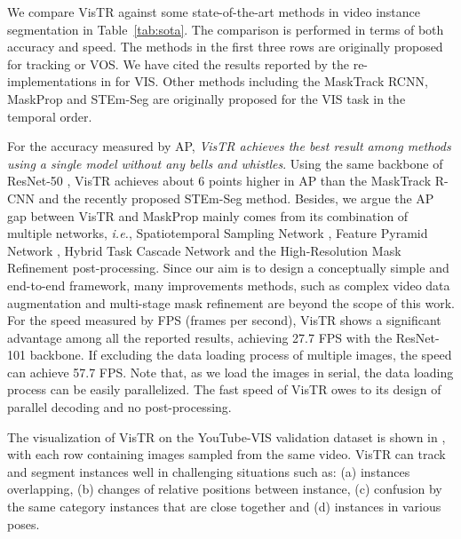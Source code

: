 \documentclass[final]{cvpr}
\def\Ours{{VisTR}\xspace}
\begin{document}
{We compare \Ours against some state-of-the-art methods in video instance segmentation in Table~\ref{tab:sota}. The comparison is performed in terms of both accuracy and speed. 
The methods in the first three rows are originally proposed for tracking or VOS.
We have cited the results reported by the re-implementations in 
\cite{vis2019} for VIS. Other methods including the MaskTrack RCNN, MaskProp \cite{bertasius2020classifying} and STEm-Seg \cite{Athar_Mahadevan20ECCV} are originally proposed for the VIS task in the temporal order. 

For the accuracy measured by AP, \textit{\Ours achieves the best result among methods using a single model without any bells and whistles}. Using the same backbone of ResNet-50 \cite{he2016deep}, \Ours achieves about 6 points higher in AP
than the MaskTrack R-CNN and the recently proposed STEm-Seg method. Besides, we argue the AP gap between \Ours and MaskProp mainly comes from its combination of multiple networks, \textit{i.e.}, Spatiotemporal Sampling Network \cite{bertasius2018object}, Feature Pyramid Network \cite{lin2017feature}, Hybrid Task Cascade Network \cite{chen2019hybrid} and the High-Resolution Mask Refinement post-processing. 
Since our aim is to design a conceptually simple and end-to-end framework, many improvements methods, such as complex video data augmentation and multi-stage mask refinement are beyond the scope of this work. For the speed measured by FPS (frames per second), \Ours shows a
significant 
advantage among all the reported results, achieving 27.7 FPS with the ResNet-101 backbone. If excluding the data loading process of multiple images, the speed 
can
achieve 57.7 FPS. Note that,
as we load the images in serial, the data loading process can be easily parallelized.
The fast speed of \Ours owes to its design of parallel decoding and no post-processing. 

The visualization of \Ours on the YouTube-VIS\cite{vis2019} validation dataset is shown in , with each row containing images sampled from the same video. 
\Ours can track and segment instances well in challenging situations
such as: (a) instances overlapping, (b) changes of relative positions between instance, (c) confusion by the same category instances 
that are close together and (d) instances in various 
poses. 



}
\end{document}
